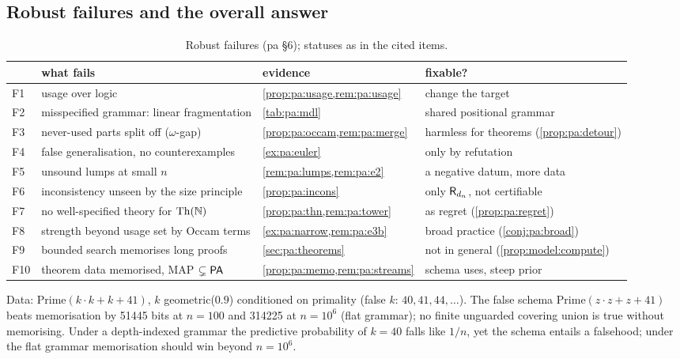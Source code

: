 \subsection{Robust failures and the overall answer}\label{sec:pa:failures}

\begin{table}[t]\centering\footnotesize
\begin{tabularx}{\textwidth}{@{}l>{\raggedright\arraybackslash}X>{\raggedright\arraybackslash}p{}>{\raggedright\arraybackslash}p{}@{}}
\toprule
& what fails & evidence & fixable?\\
\midrule
F1 & usage over logic & \cref{prop:pa:usage,rem:pa:usage} & change the target\\
F2 & misspecified grammar: linear fragmentation & \cref{tab:pa:mdl} & shared positional grammar\\
F3 & never-used parts split off ($\omega$-gap) & \cref{prop:pa:occam,rem:pa:merge} & harmless for theorems (\cref{prop:pa:detour})\\
F4 & false generalisation, no counterexamples & \cref{ex:pa:euler} & only by refutation\\
F5 & unsound lumps at small $n$ & \cref{rem:pa:lumps,rem:pa:e2} & a negative datum, more data\\
F6 & inconsistency unseen by the size principle & \cref{prop:pa:incons} & only $\mathsf{R}_{d_n}$, not certifiable\\
F7 & no well-specified theory for $\mathrm{Th}(\mathbb{N})$ & \cref{prop:pa:thn,rem:pa:tower} & as regret (\cref{prop:pa:regret})\\
F8 & strength beyond usage set by Occam terms & \cref{ex:pa:narrow,rem:pa:e3b} & broad practice (\cref{conj:pa:broad})\\
F9 & bounded search memorises long proofs & \cref{sec:pa:theorems} & not in general (\cref{prop:model:compute})\\
F10 & theorem data memorised, MAP $\subsetneq\mathsf{PA}$ & \cref{prop:pa:memo,rem:pa:streams} & schema uses, steep prior\\
\bottomrule
\end{tabularx}
\caption{Robust failures (pa \S6); statuses as in the cited items.}\label{tab:pa:failures}
\end{table}

\begin{example}\pabrk{}\label{ex:pa:euler}
Data: $\mathrm{Prime}(k\cdot k+k+41)$, $k$ geometric($0.9$) conditioned on primality (false $k$: $40,41,44,\dots$). The false schema $\mathrm{Prime}(z\cdot z+z+41)$ beats memorisation by 51445 bits at $n=100$ and 314225 at $n=10^6$ (flat grammar); no finite unguarded covering union is true without memorising. Under a depth-indexed grammar the predictive probability of $k=40$ falls like $1/n$, yet the schema entails a falsehood; under the flat grammar memorisation should win beyond $n=10^6$.
\end{example}

